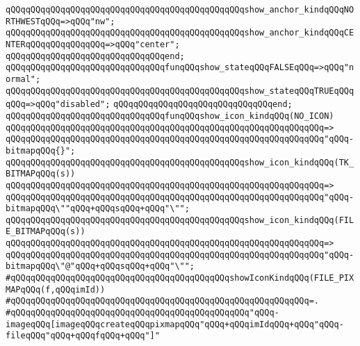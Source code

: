 \verb|qQQqqQQqqQQqqQQqqQQqqQQqqQQqqQQqqQQqqQQqqQQqqQQqshow_anchor_kindqQQqNORTHWESTqQQq=>qQQq"nw";|\newline
\verb|qQQqqQQqqQQqqQQqqQQqqQQqqQQqqQQqqQQqqQQqqQQqqQQqshow_anchor_kindqQQqCENTERqQQqqQQqqQQqqQQq=>qQQq"center";|\newline
\verb|qQQqqQQqqQQqqQQqqQQqqQQqqQQqqQQqend;|\newline
\newline
\verb|qQQqqQQqqQQqqQQqqQQqqQQqqQQqqQQqfunqQQqshow_stateqQQqFALSEqQQq=>qQQq"normal";|\newline
\verb|qQQqqQQqqQQqqQQqqQQqqQQqqQQqqQQqqQQqqQQqqQQqqQQqshow_stateqQQqTRUEqQQqqQQq=>qQQq"disabled";|\newline
\verb|qQQqqQQqqQQqqQQqqQQqqQQqqQQqqQQqend;|\newline
\newline
\verb|qQQqqQQqqQQqqQQqqQQqqQQqqQQqqQQqfunqQQqshow_icon_kindqQQq(NO_ICON)|\newline
\verb|qQQqqQQqqQQqqQQqqQQqqQQqqQQqqQQqqQQqqQQqqQQqqQQqqQQqqQQqqQQqqQQq=>|\newline
\verb|qQQqqQQqqQQqqQQqqQQqqQQqqQQqqQQqqQQqqQQqqQQqqQQqqQQqqQQqqQQqqQQq"qQQq-bitmapqQQq{}";|\newline
\newline
\verb|qQQqqQQqqQQqqQQqqQQqqQQqqQQqqQQqqQQqqQQqqQQqqQQqshow_icon_kindqQQq(TK_BITMAPqQQq(s))|\newline
\verb|qQQqqQQqqQQqqQQqqQQqqQQqqQQqqQQqqQQqqQQqqQQqqQQqqQQqqQQqqQQqqQQq=>|\newline
\verb|qQQqqQQqqQQqqQQqqQQqqQQqqQQqqQQqqQQqqQQqqQQqqQQqqQQqqQQqqQQqqQQq"qQQq-bitmapqQQq\""qQQq+qQQqsqQQq+qQQq"\"";|\newline
\newline
\verb|qQQqqQQqqQQqqQQqqQQqqQQqqQQqqQQqqQQqqQQqqQQqqQQqshow_icon_kindqQQq(FILE_BITMAPqQQq(s))|\newline
\verb|qQQqqQQqqQQqqQQqqQQqqQQqqQQqqQQqqQQqqQQqqQQqqQQqqQQqqQQqqQQqqQQq=>|\newline
\verb|qQQqqQQqqQQqqQQqqQQqqQQqqQQqqQQqqQQqqQQqqQQqqQQqqQQqqQQqqQQqqQQq"qQQq-bitmapqQQq\"@"qQQq+qQQqsqQQq+qQQq"\"";|\newline
\newline
\verb|#qQQqqQQqqQQqqQQqqQQqqQQqqQQqqQQqqQQqqQQqqQQqshowIconKindqQQq(FILE_PIXMAPqQQq(f,qQQqimId))|\newline
\verb|#qQQqqQQqqQQqqQQqqQQqqQQqqQQqqQQqqQQqqQQqqQQqqQQqqQQqqQQqqQQq=.|\newline
\verb|#qQQqqQQqqQQqqQQqqQQqqQQqqQQqqQQqqQQqqQQqqQQqqQQq"qQQq-imageqQQq[imageqQQqcreateqQQqpixmapqQQq"qQQq+qQQqimIdqQQq+qQQq"qQQq-fileqQQq"qQQq+qQQqfqQQq+qQQq"]"|\newline
